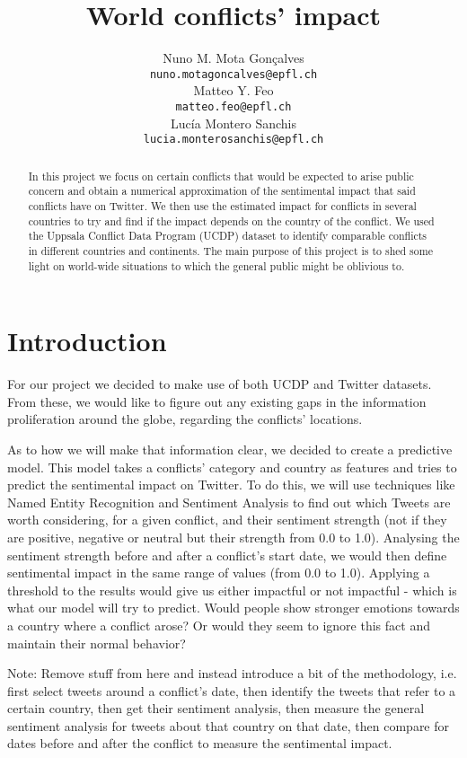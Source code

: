 \documentclass[11pt]{article}
\title{World conflicts' impact}
\author{Nuno M. Mota Gon\c{c}alves \\
  {\tt \small nuno.motagoncalves@epfl.ch} \\\And
  Matteo Y. Feo \\
  {\tt \small matteo.feo@epfl.ch} \\\And
  Luc\'{i}a Montero Sanchis\\
  {\tt \small lucia.monterosanchis@epfl.ch} \\}
\date{}
\begin{document}
\maketitle
\begin{abstract}
In this project we focus on certain conflicts that would be expected to arise public concern and obtain a numerical approximation of the sentimental impact that said conflicts have on Twitter. We then use the estimated impact for conflicts in several countries to try and find if the impact depends on the country of the conflict. We used the Uppsala Conflict Data Program (UCDP) dataset to identify comparable conflicts in different countries and continents. The main purpose of this project is to shed some light on world-wide situations to which the general public might be oblivious to.
\end{abstract}

\section{Introduction}

For our project we decided to make use of both UCDP and Twitter datasets. From these, we would like to figure out any existing gaps in the information proliferation around the globe, regarding the conflicts' locations.

As to how we will make that information clear, we decided to create a predictive model. This model takes a conflicts' category and country as features and tries to predict the sentimental impact on Twitter. To do this, we will use techniques like Named Entity Recognition and Sentiment Analysis to find out which Tweets are worth considering, for a given conflict, and their sentiment strength (not if they are positive, negative or neutral but their strength from 0.0 to 1.0). Analysing the sentiment strength before and after a conflict's start date, we would then define sentimental impact in the same range of values (from 0.0 to 1.0). Applying a threshold to the results would give us either impactful or not impactful - which is what our model will try to predict. Would people show stronger emotions towards a country where a conflict arose? Or would they seem to ignore this fact and maintain their normal behavior?

Note: Remove stuff from here and instead introduce a bit of the methodology, i.e.  first select tweets around a conflict's date, then identify the tweets that refer to a certain country, then get their sentiment analysis, then measure the general sentiment analysis for tweets about that country on that date, then compare for dates before and after the conflict to measure the sentimental impact.
\end{document}
